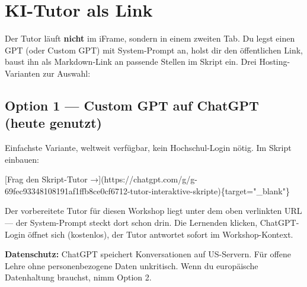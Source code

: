 \documentclass[
  ngerman,
  a4paper,
  DIV=11]{scrreprt}
\newenvironment{Shaded}{\begin{snugshade}}{\end{snugshade}}
\newcommand{\CommentTok}[1]{\textcolor[rgb]{0.37,0.37,0.37}{#1}}
\newcommand{\NormalTok}[1]{\textcolor[rgb]{0.00,0.23,0.31}{#1}}
\newcommand{\OtherTok}[1]{\textcolor[rgb]{0.00,0.23,0.31}{#1}}
\begin{document}
\section{KI-Tutor als Link}\label{ki-tutor-als-link}

Der Tutor läuft \textbf{nicht} im iFrame, sondern in einem zweiten Tab.
Du legst einen GPT (oder Custom GPT) mit System-Prompt an, holst dir den
öffentlichen Link, baust ihn als Markdown-Link an passende Stellen im
Skript ein. Drei Hosting-Varianten zur Auswahl:

\subsection{Option 1 --- Custom GPT auf ChatGPT (heute
genutzt)}\label{option-1-custom-gpt-auf-chatgpt-heute-genutzt}

Einfachste Variante, weltweit verfügbar, kein Hochschul-Login nötig. Im
Skript einbauen:

\begin{Shaded}
\begin{Highlighting}[]
\CommentTok{[}\OtherTok{Frag den Skript{-}Tutor →}\CommentTok{](https://chatgpt.com/g/g{-}69fec93348108191af1ffb8ce0cf6712{-}tutor{-}interaktive{-}skripte)}\NormalTok{\{target="\_blank"\}}
\end{Highlighting}
\end{Shaded}

Der vorbereitete Tutor für diesen Workshop liegt unter dem oben
verlinkten URL --- der System-Prompt steckt dort schon drin. Die
Lernenden klicken, ChatGPT-Login öffnet sich (kostenlos), der Tutor
antwortet sofort im Workshop-Kontext.

\begin{tcolorbox}[enhanced jigsaw, opacitybacktitle=0.6, leftrule=.75mm, title=\textcolor{quarto-callout-note-color}{\faInfo}\hspace{0.5em}{Hinweis}, colframe=quarto-callout-note-color-frame, arc=.35mm, toprule=.15mm, colbacktitle=quarto-callout-note-color!10!white, bottomrule=.15mm, colback=white, rightrule=.15mm, breakable, toptitle=1mm, bottomtitle=1mm, opacityback=0, titlerule=0mm, coltitle=black, left=2mm]

\textbf{Datenschutz:} ChatGPT speichert Konversationen auf US-Servern.
Für offene Lehre ohne personenbezogene Daten unkritisch. Wenn du
europäische Datenhaltung brauchst, nimm Option 2.

\end{tcolorbox}
\end{document}
